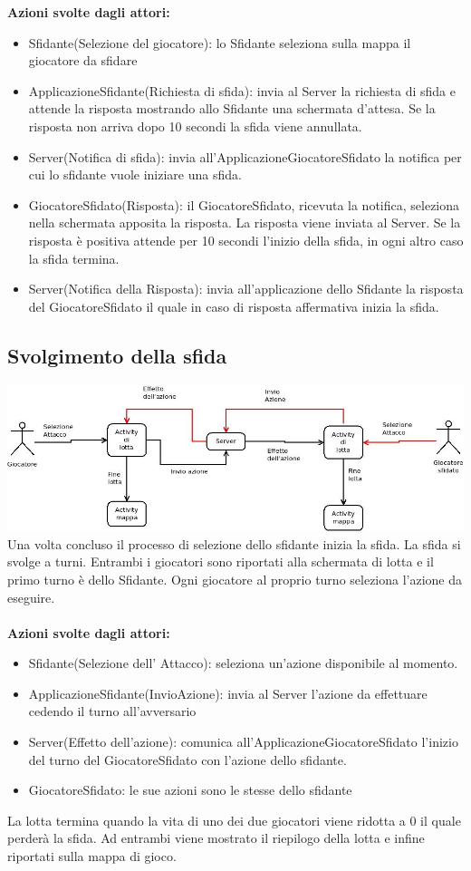 \documentclass[12pt,a4]{article}
\begin{document}
\textbf{Azioni svolte dagli attori:}
\begin{itemize} 
\item Sfidante(Selezione del giocatore): lo Sfidante seleziona sulla mappa il giocatore da sfidare
\item ApplicazioneSfidante(Richiesta di sfida): invia al Server la richiesta di sfida e attende la risposta mostrando allo Sfidante una schermata d'attesa. Se la risposta non arriva dopo 10 secondi la sfida viene annullata.
\item Server(Notifica di sfida): invia all'ApplicazioneGiocatoreSfidato la notifica per cui lo sfidante vuole iniziare una sfida.
\item GiocatoreSfidato(Risposta): il GiocatoreSfidato, ricevuta la notifica, seleziona nella schermata apposita la risposta. La risposta viene inviata al Server. Se la risposta è positiva attende per 10 secondi l'inizio della sfida, in ogni altro caso la sfida termina.
\item Server(Notifica della Risposta): invia all'applicazione dello Sfidante la risposta del GiocatoreSfidato il quale in caso di risposta affermativa inizia la sfida.
\end{itemize}

\subsection*{Svolgimento della sfida}
\includegraphics[scale=0.4]{./UseCaseSvolgimentoLotta.jpeg}\\
Una volta concluso il processo di selezione dello sfidante inizia la sfida. La sfida si svolge a turni. Entrambi i giocatori sono riportati alla schermata di lotta e il primo turno è dello Sfidante. Ogni giocatore al proprio turno seleziona l'azione da eseguire.\\
\\
\textbf{Azioni svolte dagli attori:}
\begin{itemize}
\item Sfidante(Selezione dell' Attacco): seleziona un'azione disponibile al momento.
\item ApplicazioneSfidante(InvioAzione): invia al Server l'azione da effettuare cedendo il turno all'avversario
\item Server(Effetto dell'azione): comunica all'ApplicazioneGiocatoreSfidato l'inizio del turno del GiocatoreSfidato con l'azione dello sfidante.
\item GiocatoreSfidato: le sue azioni sono le stesse dello sfidante
\end{itemize}
La lotta termina quando la vita di uno dei due giocatori viene ridotta a 0 il quale perderà la sfida. Ad entrambi viene mostrato il riepilogo della lotta e infine riportati sulla mappa di gioco.
\end{document}
